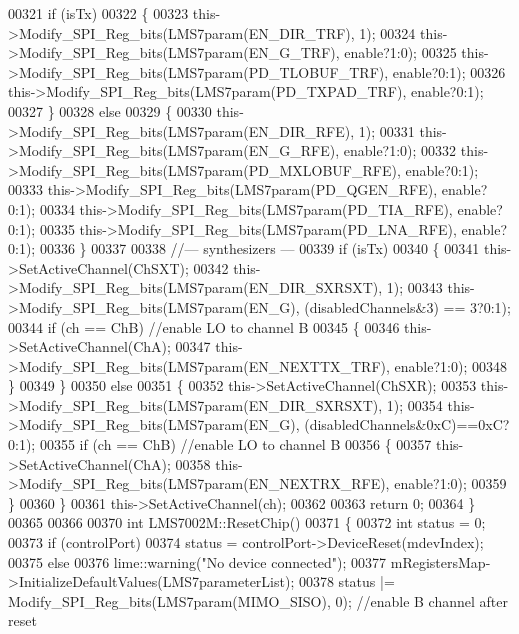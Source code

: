 \begin{DoxyCode}
00321     \textcolor{keywordflow}{if} (isTx)
00322     \{
00323         this->Modify_SPI_Reg_bits(LMS7param(EN_DIR_TRF), 1);
00324         this->Modify_SPI_Reg_bits(LMS7param(EN_G_TRF), enable?1:0);
00325         this->Modify_SPI_Reg_bits(LMS7param(PD_TLOBUF_TRF), enable?0:1);
00326         this->Modify_SPI_Reg_bits(LMS7param(PD_TXPAD_TRF), enable?0:1);
00327     \}
00328     \textcolor{keywordflow}{else}
00329     \{
00330         this->Modify_SPI_Reg_bits(LMS7param(EN_DIR_RFE), 1);
00331         this->Modify_SPI_Reg_bits(LMS7param(EN_G_RFE), enable?1:0);
00332         this->Modify_SPI_Reg_bits(LMS7param(PD_MXLOBUF_RFE), enable?0:1);
00333         this->Modify_SPI_Reg_bits(LMS7param(PD_QGEN_RFE), enable?0:1);
00334         this->Modify_SPI_Reg_bits(LMS7param(PD_TIA_RFE), enable?0:1);
00335         this->Modify_SPI_Reg_bits(LMS7param(PD_LNA_RFE), enable?0:1);
00336     \}
00337 
00338     \textcolor{comment}{//--- synthesizers ---}
00339     \textcolor{keywordflow}{if} (isTx)
00340     \{
00341         this->SetActiveChannel(ChSXT);
00342         this->Modify_SPI_Reg_bits(LMS7param(EN_DIR_SXRSXT), 1);
00343         this->Modify_SPI_Reg_bits(LMS7param(EN_G), (disabledChannels&3) == 3?0:1);
00344         \textcolor{keywordflow}{if} (ch == ChB) \textcolor{comment}{//enable LO to channel B}
00345         \{
00346             this->SetActiveChannel(ChA);
00347             this->Modify_SPI_Reg_bits(LMS7param(EN_NEXTTX_TRF), enable?1:0);
00348         \}
00349     \}
00350     \textcolor{keywordflow}{else}
00351     \{
00352         this->SetActiveChannel(ChSXR);
00353         this->Modify_SPI_Reg_bits(LMS7param(EN_DIR_SXRSXT), 1);
00354         this->Modify_SPI_Reg_bits(LMS7param(EN_G), (disabledChannels&0xC)==0xC?0:1);
00355         \textcolor{keywordflow}{if} (ch == ChB) \textcolor{comment}{//enable LO to channel B}
00356         \{
00357             this->SetActiveChannel(ChA);
00358             this->Modify_SPI_Reg_bits(LMS7param(EN_NEXTRX_RFE), enable?1:0);
00359         \}
00360     \}
00361     this->SetActiveChannel(ch);
00362 
00363     \textcolor{keywordflow}{return} 0;
00364 \}
00365 
00366 
00370 \textcolor{keywordtype}{int} LMS7002M::ResetChip()
00371 \{
00372     \textcolor{keywordtype}{int} status = 0;
00373     \textcolor{keywordflow}{if} (controlPort)
00374         status = controlPort->DeviceReset(mdevIndex);
00375     \textcolor{keywordflow}{else}
00376         lime::warning(\textcolor{stringliteral}{"No device connected"});
00377     mRegistersMap->InitializeDefaultValues(LMS7parameterList);
00378     status |= Modify_SPI_Reg_bits(LMS7param(MIMO_SISO), 0); \textcolor{comment}{//enable B channel after reset}

\end{DoxyCode}
